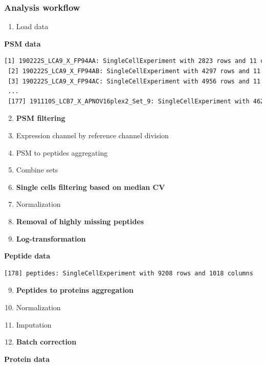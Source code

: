 \documentclass{beamer}
\newcommand{\frametitlesection}[1]{\frametitle{\centering #1 \footnotesize \hspace{0pt plus 1 filll} \insertsection}}
\begin{document}
\begin{frame}[fragile]
    \frametitlesection{Analysis workflow}

    \scriptsize

    \begin{enumerate}
        \item Load data
    \end{enumerate}

    \textbf{PSM data}

    \begin{lstlisting}[language = TeX, numbers = none, basicstyle = \ttfamily\@setfontsize{\srcsize}{5pt}{5pt}\color{vdgray}]
 [1] 190222S_LCA9_X_FP94AA: SingleCellExperiment with 2823 rows and 11 columns
 [2] 190222S_LCA9_X_FP94AB: SingleCellExperiment with 4297 rows and 11 columns
 [3] 190222S_LCA9_X_FP94AC: SingleCellExperiment with 4956 rows and 11 columns
 ...
 [177] 191110S_LCB7_X_APNOV16plex2_Set_9: SingleCellExperiment with 4626 rows and 16 columns
    \end{lstlisting}

    \pause

    \begin{enumerate}
        \setcounter{enumi}{1}
        \item \textbf<4>{PSM filtering}
        \item Expression channel by reference channel division
        \item PSM to peptides aggregating
        \item Combine sets
        \item \textbf<4>{Single cells filtering based on median CV}
        \item Normalization
        \item \textbf<4>{Removal of highly missing peptides}
        \item \textbf<4>{Log-transformation}
    \end{enumerate}

    \textbf{Peptide data}

    \begin{lstlisting}[language = TeX, numbers = none, basicstyle = \ttfamily\@setfontsize{\srcsize}{5pt}{5pt}\color{vdgray}]
 [178] peptides: SingleCellExperiment with 9208 rows and 1018 columns
    \end{lstlisting}

    \pause

    \begin{enumerate}
        \setcounter{enumi}{8}
        \item \textbf<4>{Peptides to proteins aggregation}
        \item Normalization
        \item Imputation
        \item \textbf<4>{Batch correction}
    \end{enumerate}
    \textbf{Protein data}


\end{frame}
\end{document}
